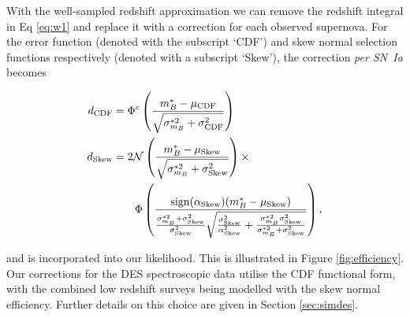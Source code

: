\documentclass[a4paper,fleqn,usenatbib]{mnras}
\newcommand{\green}{\color{forestgreen}}
\begin{document}
With the {\green well-sampled redshift} approximation we can remove the redshift integral in Eq \eqref{eq:w1} and replace it with a correction for each observed supernova. For the error function (denoted with the subscript `CDF') and skew normal selection functions respectively (denoted with a subscript `Skew'), the correction \textit{per SN~Ia} becomes

\begin{align}
d_{\rm CDF} &= \Phi^c\left(  \frac{m^*_B - \mu_{\rm CDF}}{\sqrt{\sigma^{*2}_{m_B} + \sigma_{\rm CDF}^2}}  \right) \label{eq:seldes}\\
d_{\rm Skew} &= 2\mathcal{N}\left( \frac{m_B^* - \mu_{\rm Skew}}{\sqrt{\sigma^{*2}_{m_B} + \sigma_{\rm Skew}^2}}\right) \times \notag\\
&\quad\quad \Phi\left(  \frac{{\rm sign}(\alpha_{\rm Skew})(m_B^* - \mu_{\rm Skew})}{\frac{\sigma_{m_B}^{*2} + \sigma^2_{\rm Skew}}{\sigma^2_{\rm Skew}} \sqrt{\frac{\sigma^2_{\rm Skew}}{\alpha^2_{\rm Skew}} + \frac{\sigma_{m_B}^{*2} \sigma^2_{\rm Skew}}{\sigma_{m_B}^{*2} + \sigma^2_{\rm Skew}}} }\right), \label{eq:sellow-$z$}
\end{align}

and is incorporated into our likelihood. This is illustrated in Figure \ref{fig:efficiency}. Our corrections for the DES spectroscopic data utilise the CDF functional form, with the combined low redshift surveys being modelled with the skew normal efficiency. Further details on this choice are given in Section \ref{sec:simdes}.
\end{document}
